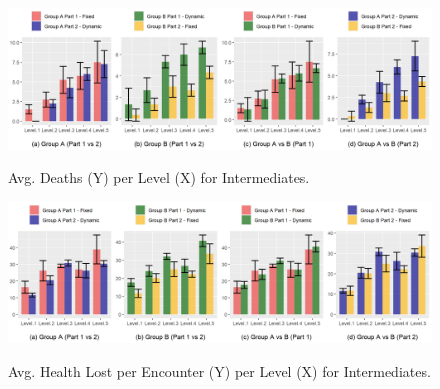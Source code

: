 \begin{figure}[!ht]
    \begin{center}
    \caption{Avg. Deaths (Y) per Level (X) for Intermediates.}
        \includegraphics[width=\textwidth]{figures/deaths_per_level-intermediate_players.png}
        \label{fig:result-metric-intermediates-deaths-per-level}
    \end{center}
\end{figure}

\begin{figure}[!ht]
    \begin{center}
    \caption{Avg. Health Lost per Encounter (Y) per Level (X) for Intermediates.}
        \includegraphics[width=\textwidth]{figures/health_lost_per_encounter-intermediate_players.png}
        \label{fig:result-metric-intermediates-health-lost-per-encounter}
    \end{center}
\end{figure}



